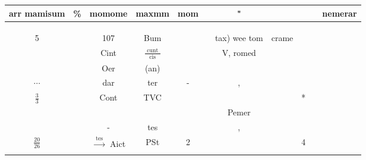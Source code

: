 \documentclass[10pt]{article}
\begin{document}
\begin{center}
\begin{tabular}{|c|c|c|c|c|c|c|c|c|c|c|}
\hline
arr mamisum & \% & momome & maxmm & mom &  & " &  &  &  & nemerar \\
\hline
 &  &  &  &  &  &  &  &  &  &  \\
\hline
 &  &  &  &  &  &  &  &  &  &  \\
\hline
 &  &  &  &  &  &  &  &  &  &  \\
\hline
5 &  & 107 & Bum &  &  & tax) wee tom & crame &  &  &  \\
\hline
 &  & Cint & \(\frac{\text { cunt }}{\text { cis }}\) &  &  & V, romed &  &  &  &  \\
\hline
 &  & Oer & (an) &  &  &  &  &  &  &  \\
\hline
\(\cdots\) &  & dar & ter & - &  & , &  &  &  &  \\
\hline
\(\frac{3}{3}\) &  & Cont & TVC &  &  &  &  & * &  &  \\
\hline
 &  &  &  &  &  & Pemer &  &  &  &  \\
\hline
 &  & - & tes &  &  & , &  &  &  &  \\
\hline
\(\frac{20}{26}\) &  & \(\xrightarrow{\text { tes }}\) Aict & PSt & 2 &  &  &  & 4 &  &  \\
\hline
 &  &  &  &  &  &  &  &  &  &  \\
\hline

\end{tabular}
\end{center}
\end{document}
